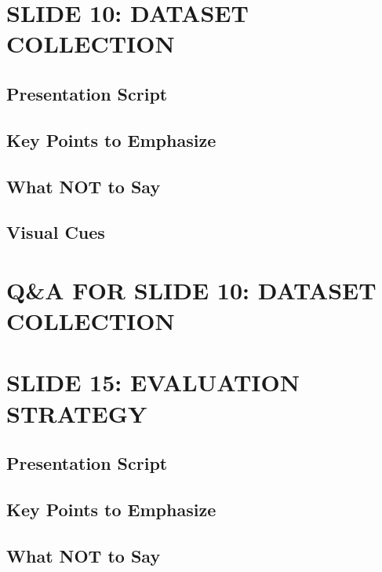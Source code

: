 \documentclass[11pt,a4paper]{article}
\begin{document}
\clearpage


\section{SLIDE 10: DATASET COLLECTION}

\subsection{Presentation Script}

\subsection{Key Points to Emphasize}

\subsection{What NOT to Say}

\subsection{Visual Cues}

\section{Q\&A FOR SLIDE 10: DATASET COLLECTION}

\section{SLIDE 15: EVALUATION STRATEGY}

\subsection{Presentation Script}

\subsection{Key Points to Emphasize}

\subsection{What NOT to Say}
\end{document}
